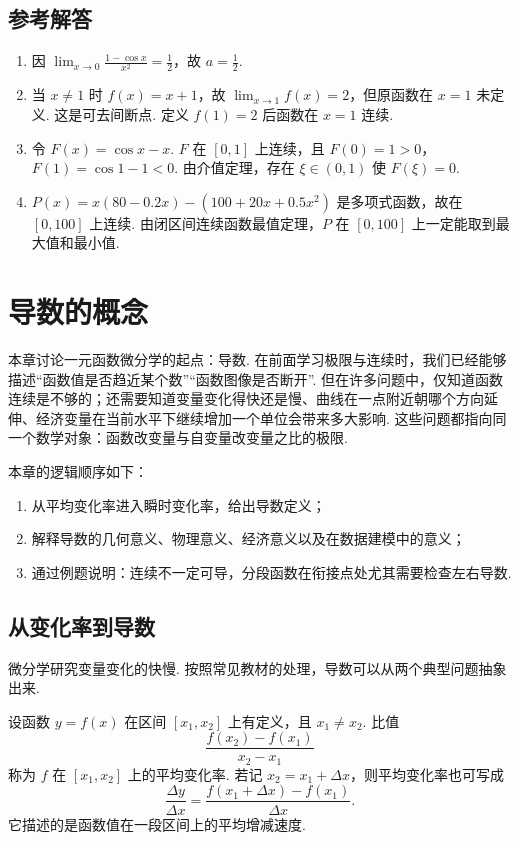 \documentclass[fontset=fandol]{ctexart}
\newcounter{DefinitionCounter}[section]
\newcounter{TheoremCounter}[section]
\newcounter{PropositionCounter}[section]
\newcounter{ExampleCounter}[section]
\newcounter{ExerciseCounter}[section]
\newcounter{ProblemCounter}[section]
\newcounter{ConclusionCounter}[section]
\newcommand{\renewEnvironmentCounter}{\setcounter{DefinitionCounter}{0}\setcounter{TheoremCounter}{0}\setcounter{PropositionCounter}{0}\setcounter{ExampleCounter}{0}\setcounter{ExerciseCounter}{0}\setcounter{ProblemCounter}{0}\setcounter{ConclusionCounter}{0}}
\begin{document}
\subsection{参考解答}
\begin{enumerate}[label=\textbf{练习\arabic*.},leftmargin=2.2em]
\item 因 $\lim_{x\to0}\frac{1-\cos x}{x^2}=\frac12$，故 $a=\frac12$.
\item 当 $x\neq1$ 时 $f(x)=x+1$，故 $\lim_{x\to1}f(x)=2$，但原函数在 $x=1$ 未定义. 这是可去间断点. 定义 $f(1)=2$ 后函数在 $x=1$ 连续.
\item 令 $F(x)=\cos x-x$. $F$ 在 $[0,1]$ 上连续，且 $F(0)=1>0$，$F(1)=\cos1-1<0$. 由介值定理，存在 $\xi\in(0,1)$ 使 $F(\xi)=0$.
\item $P(x)=x(80-0.2x)-(100+20x+0.5x^2)$ 是多项式函数，故在 $[0,100]$ 上连续. 由闭区间连续函数最值定理，$P$ 在 $[0,100]$ 上一定能取到最大值和最小值.
\end{enumerate}

\section{导数的概念}
\renewEnvironmentCounter

本章讨论一元函数微分学的起点：导数. 在前面学习极限与连续时，我们已经能够描述“函数值是否趋近某个数”“函数图像是否断开”. 但在许多问题中，仅知道函数连续是不够的；还需要知道变量变化得快还是慢、曲线在一点附近朝哪个方向延伸、经济变量在当前水平下继续增加一个单位会带来多大影响. 这些问题都指向同一个数学对象：函数改变量与自变量改变量之比的极限.

本章的逻辑顺序如下：
\begin{enumerate}[label=(\arabic*),leftmargin=2em]
\item 从平均变化率进入瞬时变化率，给出导数定义；
\item 解释导数的几何意义、物理意义、经济意义以及在数据建模中的意义；
\item 通过例题说明：连续不一定可导，分段函数在衔接点处尤其需要检查左右导数.
\end{enumerate}

\subsection{从变化率到导数}

微分学研究变量变化的快慢. 按照常见教材的处理，导数可以从两个典型问题抽象出来.

\begin{definition}[平均变化率]
设函数 $y=f(x)$ 在区间 $[x_1,x_2]$ 上有定义，且 $x_1\neq x_2$. 比值
\[
\frac{f(x_2)-f(x_1)}{x_2-x_1}
\]
称为 $f$ 在 $[x_1,x_2]$ 上的平均变化率. 若记 $x_2=x_1+\Delta x$，则平均变化率也可写成
\[
\frac{\Delta y}{\Delta x}
=\frac{f(x_1+\Delta x)-f(x_1)}{\Delta x}.
\]
它描述的是函数值在一段区间上的平均增减速度.
\end{definition}
\end{document}
